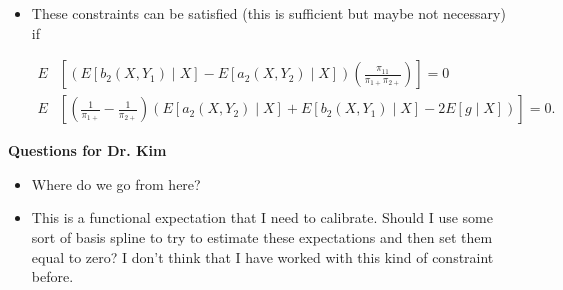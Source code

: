 \documentclass[12pt]{article}
\begin{document}
\begin{itemize}
  \item These constraints can be satisfied (this is sufficient but maybe not
    necessary) if 

    \begin{align*}
      E&\left[(E[b_2(X, Y_1) \mid X] - E[a_2(X, Y_2) \mid X])
      \left(\frac{\pi_{11}}{\pi_{1+} \pi_{2+}}\right) \right] = 0\\
      E&\left[\left(\frac{1}{\pi_{1+}} - \frac{1}{\pi_{2+}}\right)(E[a_2(X, Y_2)
      \mid X] + E[b_2(X, Y_1) \mid X] - 2E[g \mid X])\right] = 0.
    \end{align*}

\end{itemize}

\textbf{Questions for Dr. Kim}
\begin{itemize}
  \item Where do we go from here?
  \item This is a functional expectation that I need to calibrate. Should I use
    some sort of basis spline to try to estimate these expectations and then set
    them equal to zero? I don't think that I have worked with this kind of
    constraint before.
\end{itemize}
%

\newpage



\printbibliography
\end{document}

